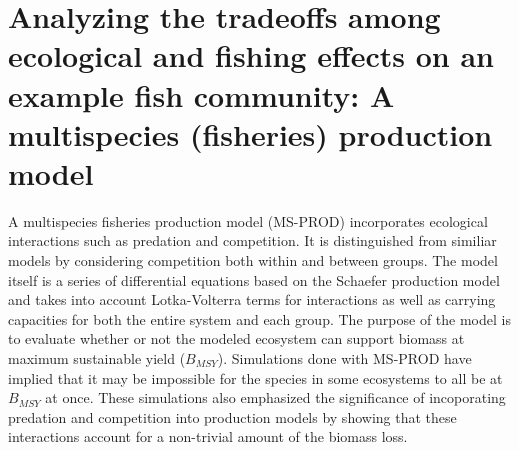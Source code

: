 \documentclass{article}
\begin{document}
\section{Analyzing the tradeoffs among ecological and fishing effects on an example fish community: A multispecies (fisheries) production model}

A multispecies fisheries production model (MS-PROD) \cite{Gamble20092570} incorporates ecological interactions such as predation and competition.  It is distinguished from similiar models by considering competition both within and between groups.  The model itself is a series of differential equations based on the Schaefer production model and takes into account Lotka-Volterra terms for interactions as well as carrying capacities for both the entire system and each group.  The purpose of the model is to evaluate whether or not the modeled ecosystem can support biomass at maximum sustainable yield ($B_{MSY}$).  Simulations done with MS-PROD have implied that it may be impossible for the species in some ecosystems to all be at $B_{MSY}$ at once.  These simulations also emphasized the significance of incoporating predation and competition into production models by showing that these interactions account for a non-trivial amount of the biomass loss.




\end{document}
